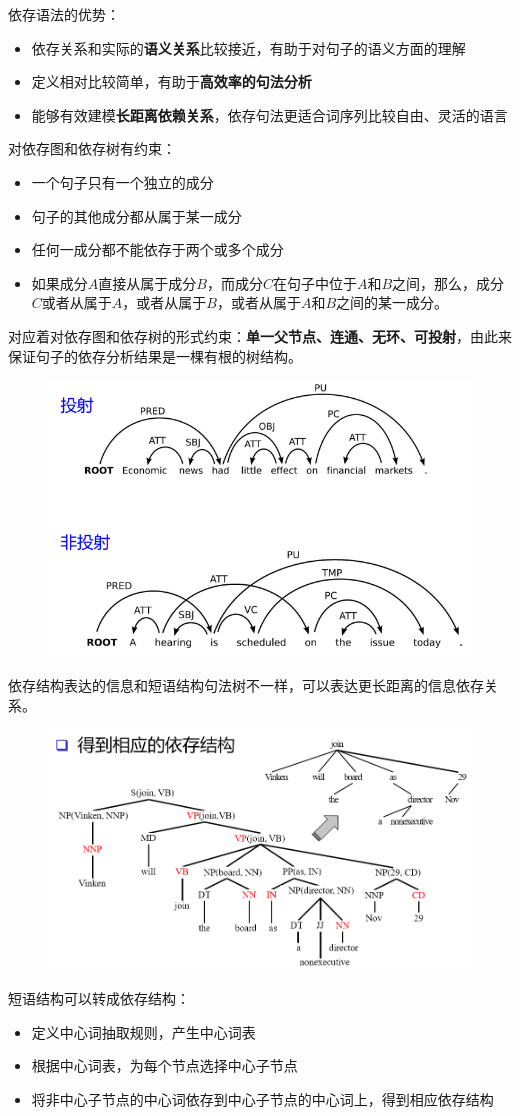 依存语法的优势：
\begin{itemize}
	\item 依存关系和实际的\textbf{语义关系}比较接近，有助于对句子的语义方面的理解
	\item 定义相对比较简单，有助于\textbf{高效率的句法分析}
	\item 能够有效建模\textbf{长距离依赖关系}，依存句法更适合词序列比较自由、灵活的语言
\end{itemize}

对依存图和依存树有约束：
\begin{itemize}
\item 一个句子只有一个独立的成分
\item 句子的其他成分都从属于某一成分
\item 任何一成分都不能依存于两个或多个成分
\item 如果成分$A$直接从属于成分$B$，而成分$C$在句子中位于$A$和$B$之间，那么，成分$C$或者从属于$A$，或者从属于$B$，或者从属于$A$和$B$之间的某一成分。
\end{itemize}
对应着对依存图和依存树的形式约束：\textbf{单一父节点、连通、无环、可投射}，由此来保证句子的依存分析结果是一棵有根的树结构。
\begin{figure}[H]
\centering
\includegraphics[width=0.6\linewidth]{fig/projective.png}
\end{figure}

依存结构表达的信息和短语结构句法树不一样，可以表达更长距离的信息依存关系。
\begin{figure}[H]
\centering
\includegraphics[width=0.6\linewidth]{fig/dependency_tree.png}
\end{figure}

短语结构可以转成依存结构：
\begin{itemize}
	\item 定义中心词抽取规则，产生中心词表
	\item 根据中心词表，为每个节点选择中心子节点
	\item 将非中心子节点的中心词依存到中心子节点的中心词上，得到相应依存结构
\end{itemize}